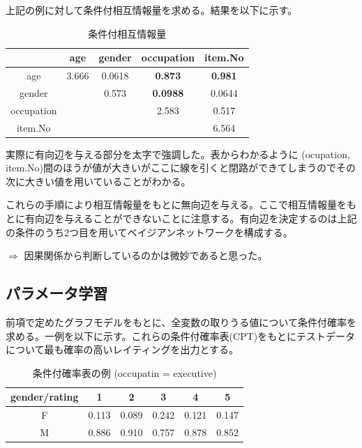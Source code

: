 \documentclass[a4j,12pt]{jarticle}
\begin{document}
上記の例に対して条件付相互情報量を求める。結果を以下に示す。

\begin{table}[H]
\begin{center}
\caption{条件付相互情報量}
\begin{tabular}{|c||c|c|c|c|} \hline  
& age & gender & occupation & item.No \\ \hline \hline
age & 3.666 & 0.0618 & \bf{0.873} & \bf{0.981} \\
gender &  & 0.573 & \bf{0.0988} & 0.0644 \\
occupation &  &  & 2.583 & 0.517 \\
item.No &  &  &  & 6.564 \\ \hline
\end{tabular}
\end{center}
\end{table}

実際に有向辺を与える部分を太字で強調した。表からわかるように (ocupation, item.No)間のほうが値が大きいがここに線を引くと閉路ができてしまうのでその次に大きい値を用いていることがわかる。

これらの手順により相互情報量をもとに無向辺を与える。ここで相互情報量をもとに有向辺を与えることができないことに注意する。有向辺を決定するのは上記の条件のうち2つ目を用いてベイジアンネットワークを構成する。

$\Rightarrow$ 因果関係から判断しているのかは微妙であると思った。

\subsection{パラメータ学習}

前項で定めたグラフモデルをもとに、全変数の取りうる値について条件付確率を求める。一例を以下に示す。これらの条件付確率表(CPT)をもとにテストデータについて最も確率の高いレイティングを出力とする。

\begin{table}[H]
\begin{center}
\caption{条件付確率表の例 (occupatin = executive)}
\begin{tabular}{|c||c|c|c|c|c|} \hline  
gender/rating & 1 & 2 & 3 & 4 & 5 \\ \hline \hline
F & 0.113 & 0.089 & 0.242 & 0.121 & 0.147 \\
M & 0.886 & 0.910 & 0.757 & 0.878 & 0.852 \\ \hline
\end{tabular}
\end{center}
\end{table}
\end{document}

